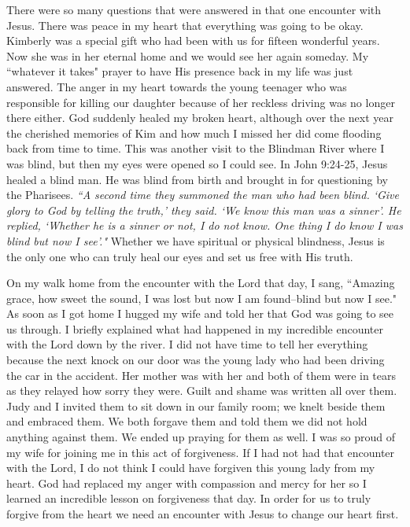 \documentclass[oneside]{book}
\begin{document}
There were so many questions that were answered in that one encounter with Jesus. There was peace in my heart that everything was going to be okay. Kimberly was a special gift who had been with us for fifteen wonderful years. Now she was in her eternal home and we would see her again someday. My ``whatever it takes" prayer to have His presence back in my life was just answered. The anger in my heart towards the young teenager who was responsible for killing our daughter because of her reckless driving was no longer there either. God suddenly healed my broken heart, although over the next year the cherished memories of Kim and how much I missed her did come flooding back from time to time. This was another visit to the Blindman River where I was blind, but then my eyes were opened so I could see. In John 9:24-25, Jesus  healed a blind man. He was blind from birth and brought in for questioning by the Pharisees. \textit{``A second time they summoned the man who had been blind. `Give glory to God by telling the truth,' they said. `We know this man was a sinner'. He replied, `Whether he is a sinner or not, I do not know. One thing I do know I was blind but now I see'."} Whether we have spiritual or physical blindness, Jesus is the only one who can truly heal our eyes and set us free with His truth.

On my walk home from the encounter with the Lord that day, I sang, ``Amazing grace, how sweet the sound, I was lost but now I am found--blind but now I see." As soon as I got home I hugged my wife and told her that God was going to see us through. I briefly explained what had happened in my incredible encounter with the Lord down by the river. I did not have time to tell her everything because the next knock on our door was the young lady who had been driving the car in the accident. Her mother was with her and both of them were in tears as they relayed how sorry they were. Guilt and shame was written all over them. Judy and I invited them to sit down in our family room; we knelt beside them and embraced them. We both forgave them and told them we did not hold anything against them. We ended up praying for them as well. I was so proud of my wife for joining me in this act of forgiveness. If I had not had that encounter with the Lord, I do not think I could have forgiven this young lady from my heart. God had replaced my anger with compassion and mercy for her so I learned an incredible lesson on forgiveness that day. In order for us to truly forgive from the heart we need an encounter with Jesus to change our heart first.
\end{document}
